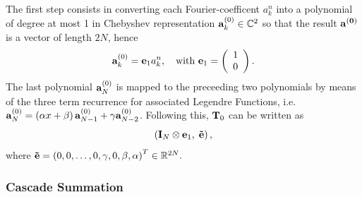The first step consists in converting each Fourier-coefficent $a_{k}^n$ into a polynomial of degree at most 1 in Chebyshev representation $\mathbf{a}_{k}^{(0)} \in \mathbb{C}^2$ so that the result $\mathbf{a^{(0)}}$ is a vector of length $2N$, hence $$ \mathbf{a}_{k}^{(0)} = \mathbf{e}_{1} a_{k}^n,\quad \text{with } \mathbf{e}_{1} = \left(\begin{array}{l}1\\0\end{array}\right).$$
The last polynomial $\mathbf{a}_{N}^{(0)}$ is mapped to the preceeding two polynomials by means of the three term recurrence for associated Legendre Functions, i.e. $\mathbf{a}_{N}^{(0)} = \left(\alpha x + \beta\right)\mathbf{a}_{N-1}^{(0)} + \gamma \mathbf{a}_{N-2}^{(0)}$. Following this, $\mathbf{T}_{0}$ can be written as
$$\left(\mathbf{I}_{N} \otimes \mathbf{e}_{1},\;\mathbf{\tilde{e}}\right),$$ 
where $\mathbf{\tilde{e}} = \left(0,0,\dots,0,\gamma, 0, \beta,\alpha\right)^T \in \mathbb{R}^{2N}.$

\subsubsection{Cascade Summation}

